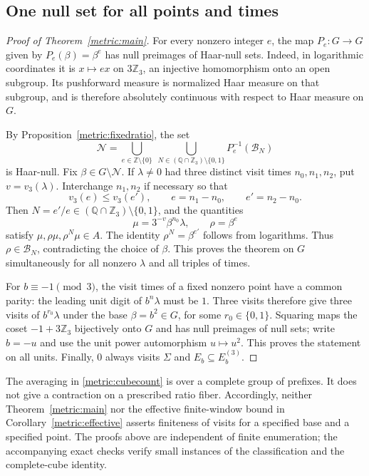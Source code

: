 \subsection{One null set for all points and times}

\begin{proof}[Proof of Theorem~\ref{metric:main}]
For every nonzero integer $e$, the map $P_e:G\to G$ given by
$P_e(\beta)=\beta^e$ has null preimages of Haar-null sets.
Indeed, in logarithmic coordinates it is $x\mapsto ex$ on
$3\mathbb Z_3$, an injective homomorphism onto an open subgroup.
Its pushforward measure is normalized Haar measure on that subgroup,
and is therefore absolutely continuous with respect to Haar measure
on $G$.

By Proposition~\ref{metric:fixedratio}, the set
\[
 \mathcal N=
 \bigcup_{e\in\mathbb Z\setminus\{0\}}
 \ \bigcup_{N\in(\mathbb Q\cap\mathbb Z_3)\setminus\{0,1\}}
                         P_e^{-1}(\mathcal B_N)
\]
is Haar-null. Fix $\beta\in G\setminus\mathcal N$. If
$\lambda\ne0$ had three distinct visit times $n_0,n_1,n_2$, put
$v=v_3(\lambda)$. Interchange $n_1,n_2$ if necessary so that
\[
 v_3(e)\leq v_3(e'),\qquad e=n_1-n_0,\qquad e'=n_2-n_0.
\]
Then $N=e'/e\in(\mathbb Q\cap\mathbb Z_3)\setminus\{0,1\}$,
and the quantities
\[
             \mu=3^{-v}\beta^{n_0}\lambda,\qquad\rho=\beta^e
\]
satisfy $\mu,\rho\mu,\rho^N\mu\in A$.
The identity $\rho^N=\beta^{e'}$ follows from logarithms.
Thus $\rho\in\mathcal B_N$, contradicting the choice of $\beta$.
This proves the theorem on $G$ simultaneously for all nonzero
$\lambda$ and all triples of times.

For $b\equiv-1\pmod3$, the visit times of a fixed nonzero point
have a common parity: the leading unit digit of $b^n\lambda$ must
be $1$. Three visits therefore give three visits of $b^{r_0}\lambda$
under the base $\beta=b^2\in G$, for some $r_0\in\{0,1\}$.
Squaring maps the coset $-1+3\mathbb Z_3$ bijectively onto $G$
and has null preimages of null sets; write $b=-u$ and use the unit
power automorphism $u\mapsto u^2$. This proves the statement on
all units. Finally, $0$ always visits $\Sigma$ and
$E_b\subseteq E_b^{(3)}$.
\end{proof}

\begin{remark}\label{metric:scope}
The averaging in \eqref{metric:cubecount} is over a complete group
of prefixes. It does not give a contraction on a prescribed ratio
fiber. Accordingly, neither Theorem~\ref{metric:main} nor the
effective finite-window bound in Corollary~\ref{metric:effective}
asserts finiteness of visits for a specified base and a specified
point. The proofs above are independent of finite enumeration;
the accompanying exact checks verify small instances of the
classification and the complete-cube identity.
\end{remark}
